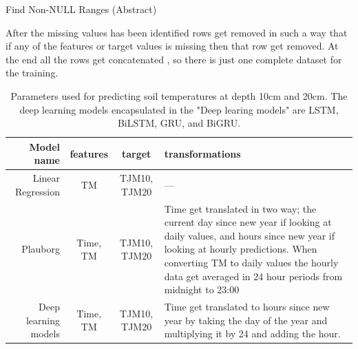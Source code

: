 \begin{algorithm}
	\caption{Find Non-NULL Ranges (Abstract)}
	\label{alg:find_non_NULL_ranges_abstract}
	
	
	\BlankLine
	
\end{algorithm}

After the missing values has been identified rows get removed in such a way that if any of the features or target values is missing then that row get removed. At the end all the rows get concatenated , so there is just one complete dataset for the training. 

\begin{table}[H]
	\centering
	\begin{tabular}{|r|c|c| p{6cm}|}
		\hline Model name & features& target & transformations \\\hline\hline
		Linear Regression & TM& TJM10, TJM20 & --- \\\hline
		Plauborg & Time, TM& TJM10, TJM20 & Time get translated in two way; the current day since new year if looking at daily values, and hours since new year if looking at hourly predictions. When converting TM to daily values the hourly data get averaged in 24 hour periods from midnight to 23:00\\\hline
		Deep learning models &Time, TM& TJM10, TJM20& Time get translated to hours since new year by taking the day of the year and multiplying it by 24 and adding the hour.\\\hline
	\end{tabular}
	\caption[Model parameters]{Parameters used for predicting soil temperatures at depth 10cm and 20cm. The deep learning models encapsulated in the "Deep learing models" are LSTM, BiLSTM, GRU, and BiGRU.}
	\label{tab:model_trans}
\end{table}

